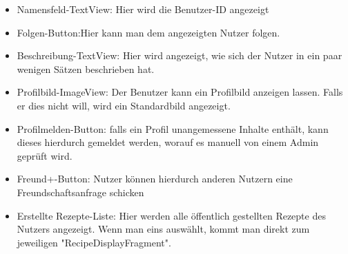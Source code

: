 \begin{itemize}[nosep]
	\item Namensfeld-TextView: Hier wird die Benutzer-ID angezeigt
	
	\item Folgen-Button:Hier kann man dem angezeigten Nutzer folgen.
	
	\item Beschreibung-TextView: Hier wird angezeigt, wie sich der Nutzer in ein paar wenigen Sätzen beschrieben hat. 
	
	\item Profilbild-ImageView: Der Benutzer kann ein Profilbild anzeigen lassen. Falls er dies nicht will, wird ein Standardbild angezeigt.
	
	\item Profilmelden-Button: falls ein Profil unangemessene Inhalte enthält, kann dieses hierdurch gemeldet werden, worauf es manuell von einem Admin geprüft wird.
	
	\item Freund+-Button: Nutzer können hierdurch anderen Nutzern eine Freundschaftsanfrage schicken
	
	\item Erstellte Rezepte-Liste: Hier werden alle öffentlich gestellten Rezepte des Nutzers angezeigt. Wenn man eins auswählt, kommt man direkt zum jeweiligen "RecipeDisplayFragment".
\end{itemize}

